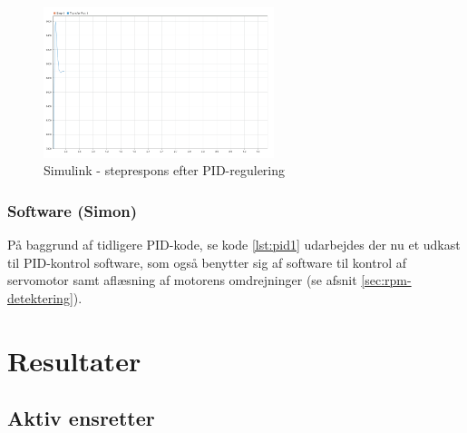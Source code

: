 \begin{figure}[h]
  \centering
  \includegraphics[width=0.6\textwidth]{./figurer/sbil2.png}
  \caption{Simulink - steprespons efter PID-regulering}
  \label{fig:sbil1}
\end{figure}

\subsection{Software (Simon)}
\label{sec:software-1}

På baggrund af tidligere PID-kode, se kode \ref{lst:pid1} udarbejdes der nu et udkast til PID-kontrol software, som også benytter sig af software til kontrol af servomotor samt aflæsning af motorens omdrejninger (se afsnit \ref{sec:rpm-detektering}).

  




\clearpage
\chapter{Resultater}
\label{sec:resultater}

\section{Aktiv ensretter}
\label{sec:aktiv-ensretter}

